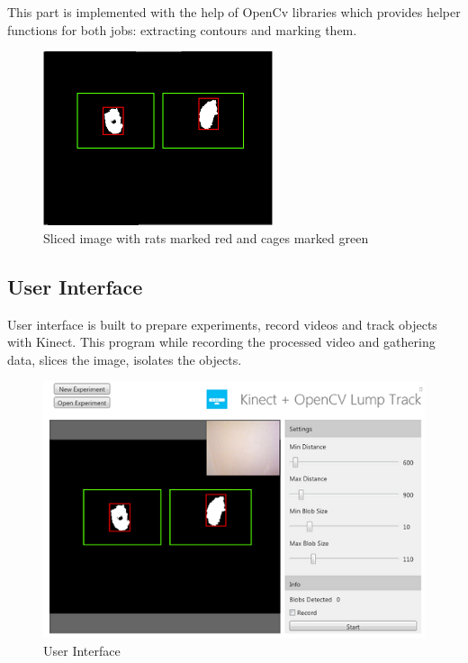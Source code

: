This part is implemented with the help of OpenCv libraries which provides helper functions for both jobs: extracting contours and marking them.
\begin{figure}[htb]
\centering
\includegraphics[scale=2]{./track} %
\caption{Sliced image with rats marked red and cages marked green}
\label{fig:label31} %
\end{figure}
\subsection{User Interface}
User interface is built to prepare experiments, record videos and track objects with Kinect. This program while recording the processed video and gathering data, slices the image, isolates the objects. 
\begin{figure}[htb]
\centering
\includegraphics[scale=1]{./UI} %
\caption{User Interface}
\label{fig:label32} %
\end{figure}

